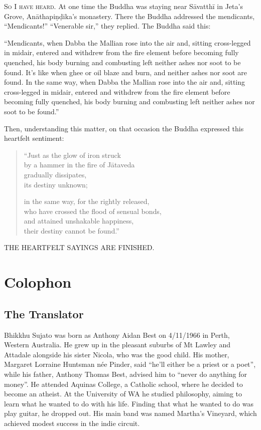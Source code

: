 \documentclass[12pt,openany]{book}%
\newcommand*{\scendbook}[1]{\bigskip\begin{Center}\uppercase{#1}\end{Center}\addvspace{1em}}
\newcommand*{\scevam}[1]{\textsc{#1}}
\let\oldbackmatter\backmatter
\renewcommand{\backmatter}{%
\chapterfont{\setstretch{.85}\normalfont\centering}%
\sectionfont{\setstretch{.85}\normalfont\BalancedRagged}%
\pagestyle{plainer}%
\oldbackmatter}
\begin{document}
\scevam{So I have heard. }At one time the Buddha was staying near \textsanskrit{Sāvatthī} in Jeta’s Grove, \textsanskrit{Anāthapiṇḍika}’s monastery. There the Buddha addressed the mendicants, “Mendicants!” “Venerable sir,” they replied. The Buddha said this: 

“Mendicants, when Dabba the Mallian rose into the air and, sitting cross-legged in midair, entered and withdrew from the fire element before becoming fully quenched, his body burning and combusting left neither ashes nor soot to be found. It’s like when ghee or oil blaze and burn, and neither ashes nor soot are found. In the same way, when Dabba the Mallian rose into the air and, sitting cross-legged in midair, entered and withdrew from the fire element before becoming fully quenched, his body burning and combusting left neither ashes nor soot to be found.” 

Then, understanding this matter, on that occasion the Buddha expressed this heartfelt sentiment: 

\begin{verse}%
“Just as the glow of iron struck \\
by a hammer in the fire of \textsanskrit{Jātaveda} \\
gradually dissipates, \\
its destiny unknown; 

in the same way, for the rightly released, \\
who have crossed the flood of sensual bonds, \\
and attained unshakable happiness, \\
their destiny cannot be found.” 

%
\end{verse}

\scendbook{The Heartfelt Sayings are finished. }

%
\backmatter%
%
\chapter*{Colophon}

\section*{The Translator}

Bhikkhu Sujato was born as Anthony Aidan Best on 4/11/1966 in Perth, Western Australia. He grew up in the pleasant suburbs of Mt Lawley and Attadale alongside his sister Nicola, who was the good child. His mother, Margaret Lorraine Huntsman née Pinder, said “he’ll either be a priest or a poet”, while his father, Anthony Thomas Best, advised him to “never do anything for money”. He attended Aquinas College, a Catholic school, where he decided to become an atheist. At the University of WA he studied philosophy, aiming to learn what he wanted to do with his life. Finding that what he wanted to do was play guitar, he dropped out. His main band was named Martha’s Vineyard, which achieved modest success in the indie circuit. 
\end{document}
